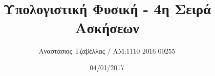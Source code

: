 \documentclass[11pt]{article}
\begin{document}
\title{Υπολογιστική Φυσική - 4η Σειρά Ασκήσεων}
\author{Αναστάσιος Τζαβέλλας / ΑΜ:1110 2016 00255}
\date{04/01/2017}
\maketitle


\FloatBarrier

\FloatBarrier

\FloatBarrier

\end{document}
